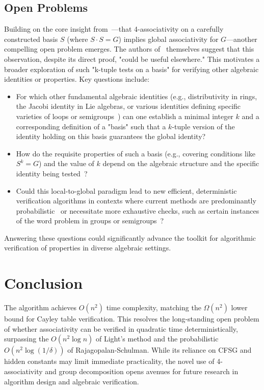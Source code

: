 \documentclass[sigconf]{acmart}
\begin{document}
\subsection{Open Problems}
Building on the core insight from~\cite{10756141}---that 4-associativity on a carefully constructed basis \(S\) (where \(S \cdot S = G\)) implies global associativity for \(G\)---another compelling open problem emerges. The authors of~\cite{10756141} themselves suggest that this observation, despite its direct proof, "could be useful elsewhere." This motivates a broader exploration of such "k-tuple tests on a basis" for verifying other algebraic identities or properties. Key questions include: 
\begin{itemize}
    \item For which other fundamental algebraic identities (e.g., distributivity in rings, the Jacobi identity in Lie algebras, or various identities defining specific varieties of loops or semigroups~\cite{Bruck1971SurveyBinary, CliffordPreston1961Vol1}) can one establish a minimal integer \(k\) and a corresponding definition of a "basis" such that a \(k\)-tuple version of the identity holding on this basis guarantees the global identity? 
    \item How do the requisite properties of such a basis (e.g., covering conditions like \(S^k = G\)) and the value of \(k\) depend on the algebraic structure and the specific identity being tested~\cite{BurrisSankappanavar1981UniversalAlgebra}?
    \item Could this local-to-global paradigm lead to new efficient, deterministic verification algorithms in contexts where current methods are predominantly probabilistic~\cite{verificationOfIdentities, 548520} or necessitate more exhaustive checks, such as certain instances of the word problem in groups or semigroups~\cite{LyndonSchupp1977Combinatorial}?
\end{itemize}
Answering these questions could significantly advance the toolkit for algorithmic verification of properties in diverse algebraic settings.

\section{Conclusion}
The algorithm achieves $O(n^2)$ time complexity, matching the $\Omega(n^2)$ lower bound for Cayley table verification. This resolves the long-standing open problem of whether associativity can be verified in quadratic time deterministically, surpassing the $O(n^2 \log n)$ of Light's method and the probabilistic $O(n^2 \log(1/\delta))$ of Rajagopalan-Schulman. While its reliance on CFSG and hidden constants may limit immediate practicality, the novel use of 4-associativity and group decomposition opens avenues for future research in algorithm design and algebraic verification.



\end{document}
